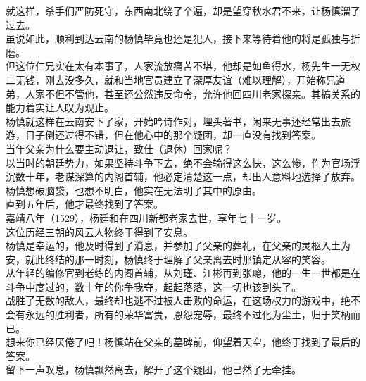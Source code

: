 \begin{multicols}{\theparacolNo}
就这样，杀手们严防死守，东西南北绕了个遍，却是望穿秋水君不来，让杨慎溜了过去。\\

虽说如此，顺利到达云南的杨慎毕竟也还是犯人，接下来等待着他的将是孤独与折磨。\\

但这位仁兄实在太有本事了，人家流放痛苦不堪，他却是如鱼得水，杨先生一无权二无钱，刚去没多久，就和当地官员建立了深厚友谊（难以理解），开始称兄道弟，人家不但不管他，甚至还公然违反命令，允许他回四川老家探亲。其搞关系的能力着实让人叹为观止。\\

杨慎就这样在云南安下了家，开始吟诗作对，埋头著书，闲来无事还经常出去旅游，日子倒还过得不错，但在他心中的那个疑团，却一直没有找到答案。\\

当年父亲为什么要主动退让，致仕（退休）回家呢？\\

以当时的朝廷势力，如果坚持斗争下去，绝不会输得这么快，这么惨，作为官场浮沉数十年，老谋深算的内阁首辅，他必定清楚这一点，却出人意料地选择了放弃。\\

杨慎想破脑袋，也想不明白，他实在无法明了其中的原由。\\

直到五年后，他才最终找到了答案。\\

嘉靖八年（1529），杨廷和在四川新都老家去世，享年七十一岁。\\

这位历经三朝的风云人物终于得到了安息。\\

杨慎是幸运的，他及时得到了消息，并参加了父亲的葬礼，在父亲的灵柩入土为安，就此终结的那一时刻，杨慎终于理解了父亲离去时那镇定从容的笑容。\\

从年轻的编修官到老练的内阁首辅，从刘瑾、江彬再到张璁，他的一生一世都是在斗争中度过的，数十年的你争我夺，起起落落，这一切也该到头了。\\

战胜了无数的敌人，最终却也逃不过被人击败的命运，在这场权力的游戏中，绝不会有永远的胜利者，所有的荣华富贵，恩怨宠辱，最终不过化为尘土，归于笑柄而已。\\

想来你已经厌倦了吧！杨慎站在父亲的墓碑前，仰望着天空，他终于找到了最后的答案。\\

留下一声叹息，杨慎飘然离去，解开了这个疑团，他已然了无牵挂。\\


\end{multicols}
